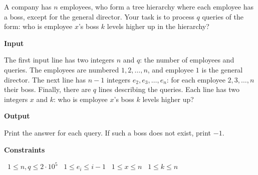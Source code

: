 A company has $n$ employees, who form a tree hierarchy where each employee has a boss, except for the general director.
Your task is to process $q$ queries of the form: who is employee $x$'s boss $k$ levels higher up in the hierarchy?

\vspace{0.3cm}\noindent\textbf{Input}

The first input line has two integers $n$ and $q$: the number of employees and queries. The employees are numbered $1,2,\dots,n$, and employee $1$ is the general director.
The next line has $n-1$ integers $e_2,e_3,\dots,e_n$: for each employee $2,3,\dots,n$ their boss.
Finally, there are $q$ lines describing the queries. Each line has two integers $x$ and $k$: who is employee $x$'s boss $k$ levels higher up?

\vspace{0.3cm}\noindent\textbf{Output}

Print the answer for each query. If such a boss does not exist, print $-1$.

\vspace{0.3cm}\noindent\textbf{Constraints}

\textbullet\ $1 \le n,q \le 2 \cdot 10^5$
\textbullet\ $1 \le e_i \le i-1$
\textbullet\ $1 \le x \le n$
\textbullet\ $1 \le k \le n$